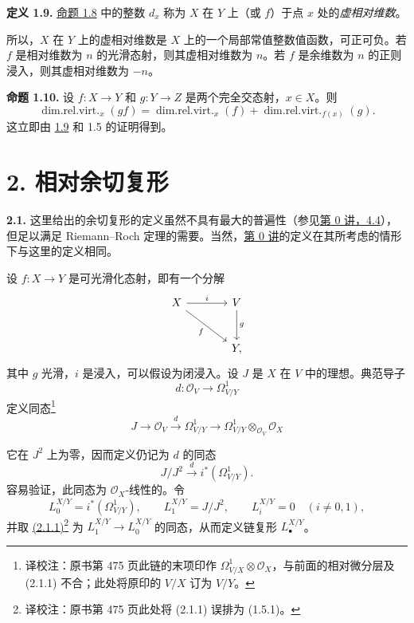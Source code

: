 \textbf{定义 1.9.} \hyperlink{sga6.e08.prop.1-8}{命题 1.8} 中的整数 $d_x$ 称为 $X$ 在 $Y$ 上（或 $f$）于点 $x$ 处的\emph{虚相对维数}。

所以，$X$ 在 $Y$ 上的虚相对维数是 $X$ 上的一个局部常值整数值函数，可正可负。若 $f$ 是相对维数为 $n$ 的光滑态射，则其虚相对维数为 $n$。若 $f$ 是余维数为 $n$ 的正则浸入，则其虚相对维数为 $-n$。

\textbf{命题 1.10.} 设 $f:X\to Y$ 和 $g:Y\to Z$ 是两个完全交态射，$x\in X$。则
\[
\operatorname{dim.rel.virt.}_x(gf)=
\operatorname{dim.rel.virt.}_x(f)+
\operatorname{dim.rel.virt.}_{f(x)}(g).
\]
这立即由 \hyperlink{sga6.e08.def.1-9}{1.9} 和 1.5 的证明得到。

\section*{2. 相对余切复形}

\textbf{2.1.} 这里给出的余切复形的定义虽然不具有最大的普遍性（参见\hyperlink{sga6.e00.sec.4.4}{第 0 讲，4.4}），但足以满足 Riemann--Roch 定理的需要。当然，\hyperlink{sga6.e00.expose}{第 0 讲}的定义在其所考虑的情形下与这里的定义相同。

设 $f:X\to Y$ 是可光滑化态射，即有一个分解
\[
\begin{tikzcd}[column sep=large,row sep=large]
X \arrow[r,"i"] \arrow[dr,"f"'] & V \arrow[d,"g"]\\
& Y,
\end{tikzcd}
\]
其中 $g$ 光滑，$i$ 是浸入，可以假设为闭浸入。设 $J$ 是 $X$ 在 $V$ 中的理想。典范导子
\[
d:\mathcal O_V\longrightarrow\Omega^1_{V/Y}
\]
定义同态\footnote{译校注：原书第 475 页此链的末项印作 \(\Omega^1_{V/X}\otimes\mathcal O_X\)，与前面的相对微分层及 (2.1.1) 不合；此处将原印的 \(V/X\) 订为 \(V/Y\)。}
\[
J\longrightarrow\mathcal O_V\xrightarrow{d}\Omega^1_{V/Y}\longrightarrow
\Omega^1_{V/Y}\otimes_{\mathcal O_V}\mathcal O_X
\]

它在 $J^2$ 上为零，因而定义仍记为 $d$ 的同态
\begin{equation}\tag{2.1.1}
J/J^2\xrightarrow{d} i^*(\Omega^1_{V/Y}).
\end{equation}
容易验证，此同态为 $\mathcal O_X$-线性的。令
\[
L^{X/Y}_0=i^*(\Omega^1_{V/Y}),\qquad
L^{X/Y}_1=J/J^2,
\qquad
L^{X/Y}_i=0\quad(i\neq 0,1),
\]
并取 \hyperlink{sga6.e08.eq.2-1-1}{(2.1.1)}\footnote{译校注：原书第 475 页此处将 (2.1.1) 误排为 (1.5.1)。} 为 $L^{X/Y}_1\to L^{X/Y}_0$ 的同态，从而定义链复形 $L^{X/Y}_\bullet$。

